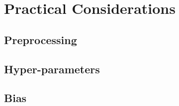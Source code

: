\chapter{Practical Considerations}\label{chap:practical}

\section{Preprocessing}

\section{Hyper-parameters}

\section{Bias}
